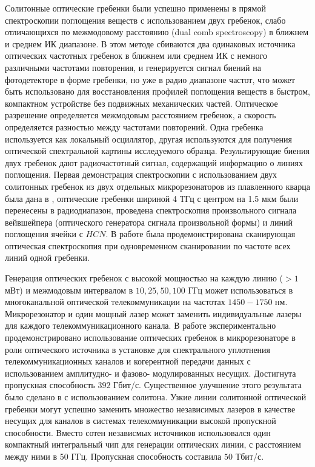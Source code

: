 Солитонные оптические гребенки были успешно применены в прямой спектроскопии поглощения веществ с использованием двух гребенок, слабо отличающихся по межмодовому расстоянию (dual comb spectroscopy) в ближнем \cite{Suh2016} и среднем ИК диапазоне\cite{Yu2018}. В этом методе сбиваются два одинаковых источника оптических частотных гребенок в ближнем или среднем ИК с немного различными частотами повторения, и генерируется сигнал биений на фотодетекторе в форме гребенки, но уже в радио диапазоне частот, что может быть использовано для восстановления профилей поглощения веществ в быстром, компактном устройстве без подвижных механических частей. Оптическое разрешение определяется межмодовым расстоянием гребенок, а скорость определяется разностью между частотами повторений. Одна гребенка используется как локальный осциллятор, другая используются для получения оптической спектральной картины исследуемого образца. Результирующие биения двух гребенок дают радиочастотный сигнал, содержащий информацию о линиях поглощения. Первая демонстрация спектроскопии с использованием двух солитонных гребенок из двух отдельных микрорезонаторов из плавленного кварца была дана в \cite{Suh2016}, оптические гребенки шириной 4 ТГц с центром на 1.5 мкм были перенесены в радиодиапазон, проведена спектроскопия произвольного сигнала вейвшейпера (оптического генератора сигнала произвольной формы) и линий поглощения ячейки с $HCN$. В работе \cite{} была продемонстрирована сканирующая оптическая спектроскопия при одновременном сканировании по частоте всех линий одной гребенки.

Генерация оптических гребенок с высокой мощностью на каждую линию ($>1$ мВт) и межмодовым интервалом в $10,25,50,100$ ГГц может использоваться в многоканальной оптической телекоммуникации на частотах $1450-1750$ нм. Микрорезонатор и один мощный лазер может заменить индивидуальные лазеры для каждого телекоммуникационного канала. В работе \cite{Pfeifle2014} экспериментально продемонстрировано использование оптических гребенок в микрорезонаторе в роли оптического источника в установке для спектрального уплотнения телекоммуникационных каналов и когерентной передачи данных с использованием амплитудно- и фазово- модулированных несущих. Достигнута пропускная способность $392$ Гбит/с. Существенное улучшение этого результата было сделано в \cite{} с использованием солитона. Узкие линии солитонной оптической гребенки могут успешно заменить множество независимых лазеров в качестве несущих для каналов в системах телекоммуникации высокой пропускной способности. Вместо сотен независмых источников использовался один компактный интегральный чип для генерации оптических линии, с расстоянием между ними в 50 ГГц. Пропускная способность составила $50$ Тбит/с.

